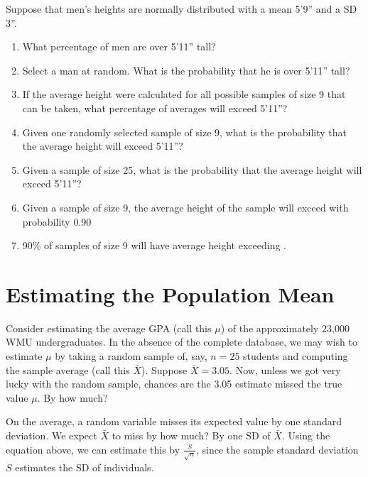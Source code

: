 \documentclass[11pt, chapterprefix=true]{scrbook}\usepackage[]{graphicx}\usepackage[]{color}
\begin{document}
Suppose that men's heights are normally distributed with a mean 5'9'' and a SD 3''.
  
  \begin{enumerate}
  \item What percentage of men are over 5'11'' tall?
  \item Select a man at random.  What is the probability that he is over 5'11'' tall?
  \item If the average height were calculated for all possible samples of size 9 that can be taken, what percentage of averages will exceed 5'11''?
  \item Given one randomly selected sample of size 9, what is the probability that the average height will exceed 5'11''?
  \item Given a sample of size 25, what is the probability that the average height will exceed 5'11''?
  \item Given a sample of size 9, the average height of the sample will exceed \underline{\phantom{xxxxxxxx}} with probability 0.90
  \item 90\% of samples of size 9 will have average height exceeding \underline{\phantom{xxxxxxxx}}.
  \end{enumerate}

\section{Estimating the Population Mean}

Consider estimating the average GPA (call this $\mu$) of the approximately 23,000 WMU undergraduates.  In the absence of the complete database, we may wish to estimate $\mu$ by taking a random sample of, say, $n = 25$ students and computing the sample average (call this $\bar{X}$).  Suppose $\bar{X} = 3.05$.  Now, unless we got very lucky with the random sample, chances are the 3.05 estimate missed the true value $\mu$.  By how much?

On the average, a random variable misses its expected value by one standard deviation.  We expect $\bar{X}$ to miss by how much?  By one SD of $\bar{X}$.  Using the equation above, we can estimate this by $\frac{S}{\sqrt{n}}$, since the sample standard deviation $S$ estimates the SD of individuals.

\end{document}
